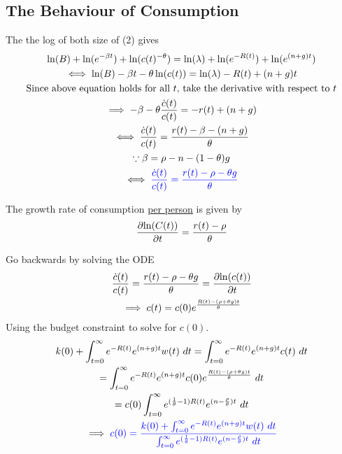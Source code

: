 \documentclass[11pt]{article}
\begin{document}
		\subsection{The Behaviour of Consumption}
			\par The the log of both size of (2) gives 
			\begin{gather*}
				\ln(B) + \ln(e^{-\beta t}) + \ln(c(t)^{-\theta}) = \ln(\lambda) + \ln(e^{-R(t)}) + \ln(e^{(n+g)t}) \\
				\iff \ln(B) - \beta t - \theta \ln(c(t)) = \ln(\lambda) - R(t) + (n+g)t \\
				\text{{Since above equation holds for all $t$, take the derivative with respect to $t$}} \\
				\implies -\beta - \theta \frac{\dot{c}(t)}{c(t)} = -r(t) + (n+g) \\
				\iff \frac{\dot{c}(t)}{c(t)} = \frac{r(t) - \beta - (n + g)}{\theta} \\
				\because \beta = \rho - n - (1-\theta) g\\
				\iff 
				\textcolor{blue}{
					\frac{\dot{c}(t)}{c(t)} = \frac{r(t) - \rho - \theta g}{\theta}
				}
			\end{gather*}
			\begin{remark}
				The growth rate of consumption \ul{per person} is given by
				\begin{equation}
					\frac{\partial{\ln(C(t))}}{\partial{t}} = \frac{r(t)-\rho}{\theta}
				\end{equation}
			\end{remark}
			\begin{remark}
				Go backwards by solving the ODE
				\begin{gather*}
					\frac{\dot{c}(t)}{c(t)} = \frac{r(t) - \rho - \theta g}{\theta} = \frac{\partial{\ln(c(t))}}{\partial{t}} \\
					\implies c(t) = c(0) e^{\frac{R(t) - (\rho + \theta g)t}{\theta}}
				\end{gather*}
				Using the budget constraint to solve for $c(0)$.
				\begin{gather*}
					k(0) + \int_{t=0}^\infty {e^{-R(t)} e^{(n+g)t} w(t)\ dt} = \int_{t=0}^\infty {e^{-R(t)} e^{(n+g)t} c(t)\ dt} \\
					= \int_{t=0}^\infty {e^{-R(t)} e^{(n+g)t} c(0) e^{\frac{R(t) - (\rho + \theta g)t}{\theta}}}\ dt \\
					= c(0) \int_{t=0}^\infty e^{(\frac{1}{\theta} - 1)R(t)} e^{(n - \frac{\rho}{\theta})t} \ dt \\
					\implies
					\textcolor{blue}{
					c(0) = \frac{
					k(0) + \int_{t=0}^\infty {e^{-R(t)} e^{(n+g)t} w(t)\ dt}
					}{
					\int_{t=0}^\infty e^{(\frac{1}{\theta} - 1)R(t)} e^{(n - \frac{\rho}{\theta})t} \ dt
					}
					}
				\end{gather*}
			\end{remark}
\end{document}
